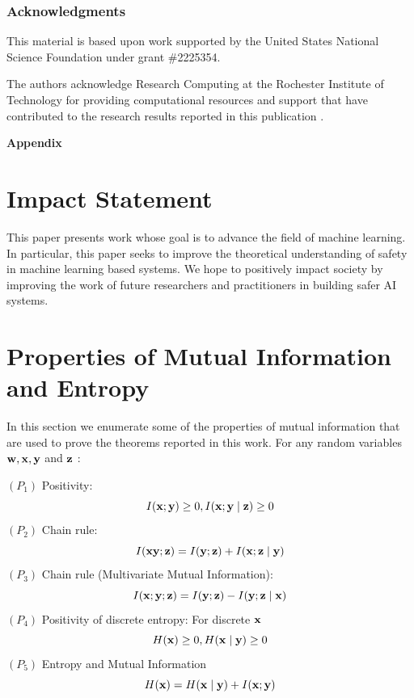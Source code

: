 \documentclass{article} %
\theoremstyle{plain}
\theoremstyle{definition}
\theoremstyle{remark}
\begin{document}
\subsubsection*{Acknowledgments}
This material is based upon work supported by the United States National Science Foundation under grant \#2225354. 

The authors acknowledge Research Computing at the Rochester Institute of Technology for providing computational resources and support that have contributed to the research results reported in this publication \citep{ritrc}.




\newpage
\appendix

\begin{center}
    {\bf \large Appendix}
\end{center}


\section{Impact Statement}

This paper presents work whose goal is to advance the field of machine learning. In particular, this paper seeks to improve the theoretical understanding of safety in machine learning based systems. We hope to positively impact society by improving the work of future researchers and practitioners in building safer AI systems. 


\section{Properties of Mutual Information and Entropy}

In this section we enumerate some of the properties of mutual information that are used to prove the theorems reported in this work. For any random variables ${\mathbf{w}}, {\mathbf{x}}, {\mathbf{y}}$ and ${\mathbf{z}}$ :

$\left(P_1\right)$ Positivity:
$$
I({\mathbf{x}} ; {\mathbf{y}}) \geq 0, I({\mathbf{x}} ; {\mathbf{y}} \mid {\mathbf{z}}) \geq 0
$$
$\left(P_2\right)$ Chain rule:
$$
I({\mathbf{x}} {\mathbf{y}} ; {\mathbf{z}})=I({\mathbf{y}} ; {\mathbf{z}})+I({\mathbf{x}} ; {\mathbf{z}} \mid {\mathbf{y}})
$$
$\left(P_3\right)$ Chain rule (Multivariate Mutual Information):
$$
I({\mathbf{x}} ; {\mathbf{y}} ; {\mathbf{z}})=I({\mathbf{y}} ; {\mathbf{z}})-I({\mathbf{y}} ; {\mathbf{z}} \mid {\mathbf{x}})
$$
$\left(P_4\right)$ Positivity of discrete entropy:
For discrete ${\mathbf{x}}$
$$
H({\mathbf{x}}) \geq 0, H({\mathbf{x}} \mid {\mathbf{y}}) \geq 0
$$
$\left(P_5\right)$ Entropy and Mutual Information
$$
H({\mathbf{x}})=H({\mathbf{x}} \mid {\mathbf{y}})+I({\mathbf{x}} ; {\mathbf{y}})
$$
\end{document}
